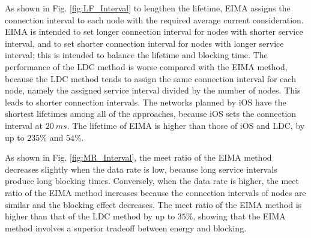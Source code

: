 \documentclass[10pt,journal,compsoc]{IEEEtran}
\begin{document}


As shown in Fig. \ref{fig:LF_Interval} to lengthen the lifetime, EIMA assigns the connection interval to each node with the required average current consideration. EIMA is intended to set longer connection interval for nodes with shorter service interval, and to set shorter connection interval for nodes with longer service interval; this is intended to balance the lifetime and blocking time. The performance of the LDC method is worse compared with the EIMA method, because the LDC method tends to assign the same connection interval for each node, namely the assigned service interval divided by the number of nodes. This leads to shorter connection intervals. The networks planned by iOS have the shortest lifetimes among all of the approaches, because iOS sets the connection interval at $20~ms$. The lifetime of EIMA is higher than those of iOS and LDC, by up to $235\%$ and $54\%$.

As shown in Fig. \ref{fig:MR_Interval}, the meet ratio of the EIMA method decreases slightly when the data rate is low, because long service intervals produce long blocking times. Conversely, when the data rate is higher, the meet ratio of the EIMA method increases because the connection intervals of nodes are similar and the blocking effect decreases. The meet ratio of the EIMA method is higher than that of the LDC method by up to $35\%$, showing that the EIMA method involves a superior tradeoff between energy and blocking.
\end{document}
